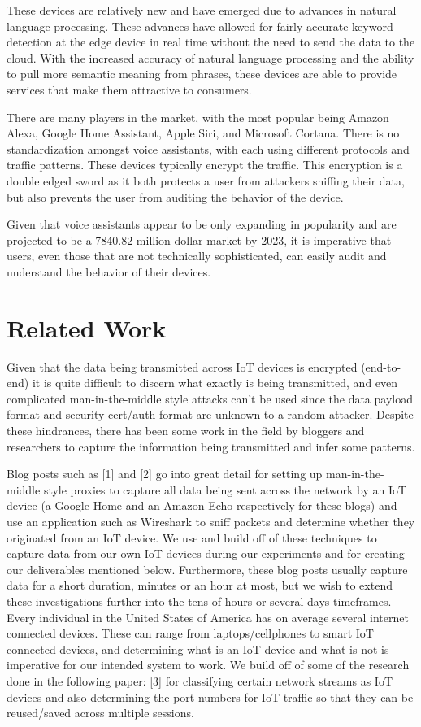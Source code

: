 \documentclass[sigconf]{acmart}
\begin{document}
These devices are relatively new and have emerged due to advances in natural language processing. These advances have allowed for fairly accurate keyword detection at the edge device in real time without the need to send the data to the cloud. With the increased accuracy of natural language processing and the ability to pull more semantic meaning from phrases, these devices are able to provide services that make them attractive to consumers.

There are many players in the market, with the most popular being Amazon Alexa, Google Home Assistant, Apple Siri, and Microsoft Cortana. There is no standardization amongst voice assistants, with each using different protocols and traffic patterns. These devices typically encrypt the traffic. This encryption is a double edged sword as it both protects a user from attackers sniffing their data, but also prevents the user from auditing the behavior of the device. 

Given that voice assistants appear to be only expanding in popularity and are projected to be a 7840.82 million dollar market by 2023, it is imperative that users, even those that are not technically sophisticated, can easily audit and understand the behavior of their devices.

\section{Related Work}
Given that the data being transmitted across IoT devices is encrypted (end-to-end) it is quite difficult to discern what exactly is being transmitted, and even complicated man-in-the-middle style attacks can’t be used since the data payload format and security cert/auth format are unknown to a random attacker. Despite these hindrances, there has been some work in the field by bloggers and researchers to capture the information being transmitted and infer some patterns. 

Blog posts such as [1] and [2] go into great detail for setting up man-in-the-middle style proxies to capture all data being sent across the network by an IoT device (a Google Home and an Amazon Echo respectively for these blogs) and use an application such as Wireshark to sniff packets and determine whether they originated from an IoT device. We use and build off of these techniques to capture data from our own IoT devices during our experiments and for creating our deliverables mentioned below. Furthermore, these blog posts usually capture data for a short duration, minutes or an hour at most, but we wish to extend these investigations further into the tens of hours or several days timeframes.
Every individual in the United States of America has on average several internet connected devices. These can range from laptops/cellphones to smart IoT connected devices, and determining what is an IoT device and what is not is imperative for our intended system to work. We build off of some of the research done in the following paper: [3] for classifying certain network streams as IoT devices and also determining the port numbers for IoT traffic so that they can be reused/saved across multiple sessions.
\end{document}
